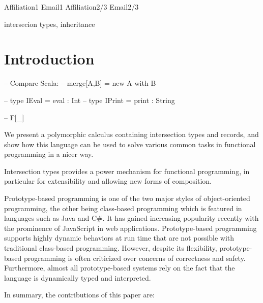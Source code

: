 \documentclass[preprint]{sigplanconf}
\begin{document}
\setlength{\pdfpageheight}{\paperheight}
\setlength{\pdfpagewidth}{\paperwidth}

\title{\name}

           {Affiliation1}
           {Email1}
           {Affiliation2/3}
           {Email2/3}

\maketitle

\begin{abstract}
\end{abstract}

\keywords
intersecion types, inheritance
\section{Introduction}

-- Compare Scala:
-- merge[A,B] = new A with B

-- type IEval  = { eval :  Int }
-- type IPrint = { print : String }

-- F[\_]

We present a polymorphic calculus containing intersection types and records, and show
how this language can be used to solve various common tasks in functional
programming in a nicer way.

Intersection types provides a power mechanism for functional programming, in
particular for extensibility and allowing new forms of composition.

Prototype-based programming is one of the two major styles of object-oriented
programming, the other being class-based programming which is featured in
languages such as Java and C\#. It has gained increasing popularity recently
with the prominence of JavaScript in web applications. Prototype-based
programming supports highly dynamic behaviors at run time that are not possible
with traditional class-based programming. However, despite its flexibility,
prototype-based programming is often criticized over concerns of correctness and
safety. Furthermore, almost all prototype-based systems rely on the fact that
the language is dynamically typed and interpreted.

In summary, the contributions of this paper are:
\end{document}
